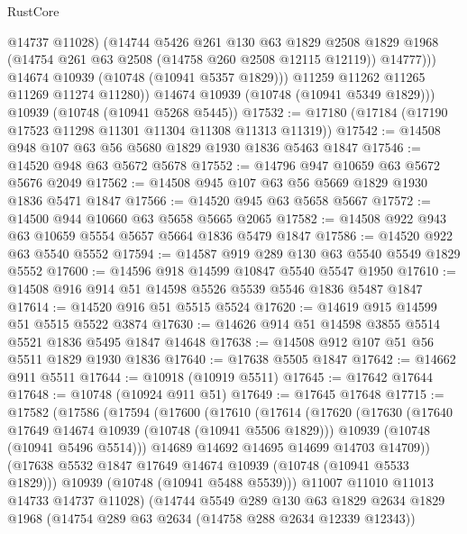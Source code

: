 \begin{lexlean}{RustCore}
\begin{coremodule}
                  @14737
                  @11028)
                (@14744
                  @5426
                  @261
                  @130
                  @63
                  @1829
                  @2508
                  @1829
                  @1968
                  (@14754 @261 @63 @2508 (@14758 @260 @2508 @12115 @12119))
                  @14777)))
            @14674
            @10939
            (@10748 (@10941 @5357 @1829)))
          @11259
          @11262
          @11265
          @11269
          @11274
          @11280))
      @14674
      @10939
      (@10748 (@10941 @5349 @1829)))
    @10939
    (@10748 (@10941 @5268 @5445))
@17532 := @17180 (@17184 (@17190 @17523 @11298 @11301 @11304 @11308 @11313 @11319))
@17542 := @14508 @948 @107 @63 @56 @5680 @1829 @1930 @1836 @5463 @1847
@17546 := @14520 @948 @63 @5672 @5678
@17552 := @14796 @947 @10659 @63 @5672 @5676 @2049
@17562 := @14508 @945 @107 @63 @56 @5669 @1829 @1930 @1836 @5471 @1847
@17566 := @14520 @945 @63 @5658 @5667
@17572 := @14500 @944 @10660 @63 @5658 @5665 @2065
@17582 := @14508 @922 @943 @63 @10659 @5554 @5657 @5664 @1836 @5479 @1847
@17586 := @14520 @922 @63 @5540 @5552
@17594 := @14587 @919 @289 @130 @63 @5540 @5549 @1829 @5552
@17600 := @14596 @918 @14599 @10847 @5540 @5547 @1950
@17610 := @14508 @916 @914 @51 @14598 @5526 @5539 @5546 @1836 @5487 @1847
@17614 := @14520 @916 @51 @5515 @5524
@17620 := @14619 @915 @14599 @51 @5515 @5522 @3874
@17630 := @14626 @914 @51 @14598 @3855 @5514 @5521 @1836 @5495 @1847 @14648
@17638 := @14508 @912 @107 @51 @56 @5511 @1829 @1930 @1836
@17640 := @17638 @5505 @1847
@17642 := @14662 @911 @5511
@17644 := @10918 (@10919 @5511)
@17645 := @17642 @17644
@17648 := @10748 (@10924 @911 @51)
@17649 := @17645 @17648
@17715 := @17582
    (@17586
      (@17594
        (@17600
          (@17610
            (@17614
              (@17620
                (@17630
                  (@17640 @17649 @14674 @10939 (@10748 (@10941 @5506 @1829)))
                  @10939
                  (@10748 (@10941 @5496 @5514)))
                @14689
                @14692
                @14695
                @14699
                @14703
                @14709))
            (@17638 @5532 @1847 @17649 @14674 @10939 (@10748 (@10941 @5533 @1829)))
            @10939
            (@10748 (@10941 @5488 @5539)))
          @11007
          @11010
          @11013
          @14733
          @14737
          @11028)
        (@14744
          @5549
          @289
          @130
          @63
          @1829
          @2634
          @1829
          @1968
          (@14754 @289 @63 @2634 (@14758 @288 @2634 @12339 @12343))

\end{coremodule}
\end{lexlean}
